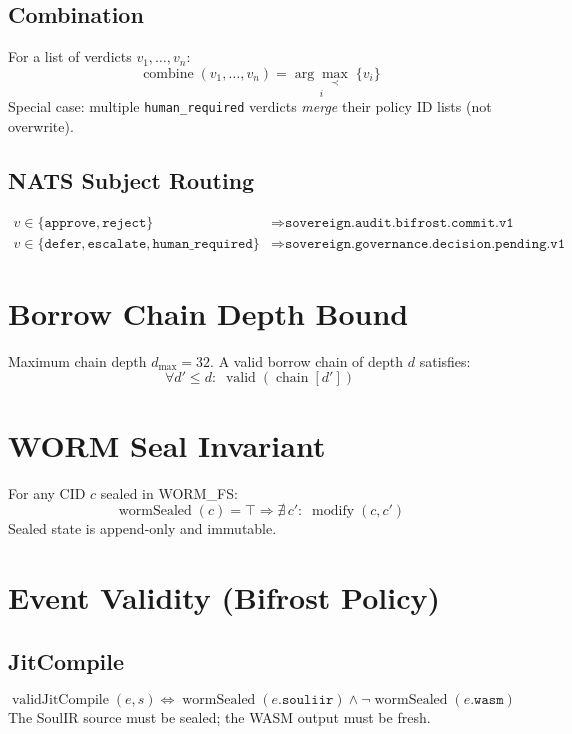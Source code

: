 \documentclass{article}
\begin{document}
\subsection{Combination}
For a list of verdicts $v_1, \ldots, v_n$:
\begin{equation}
  \operatorname{combine}(v_1, \ldots, v_n) = \underset{i}{\arg\max_\prec}\; \{v_i\}
\end{equation}
Special case: multiple \texttt{human\_required} verdicts \emph{merge} their policy ID lists (not overwrite).

\subsection{NATS Subject Routing}
\begin{align}
  v \in \{\texttt{approve}, \texttt{reject}\} &\Rightarrow \texttt{sovereign.audit.bifrost.commit.v1} \\
  v \in \{\texttt{defer}, \texttt{escalate}, \texttt{human\_required}\} &\Rightarrow \texttt{sovereign.governance.decision.pending.v1}
\end{align}

\section{Borrow Chain Depth Bound}
Maximum chain depth $d_{\max} = 32$. A valid borrow chain of depth $d$ satisfies:
\begin{equation}
  \forall d' \leq d:\; \operatorname{valid}(\operatorname{chain}[d'])
\end{equation}

\section{WORM Seal Invariant}
For any CID $c$ sealed in WORM\_FS:
\begin{equation}
  \operatorname{wormSealed}(c) = \top \Rightarrow \nexists\, c':\; \operatorname{modify}(c, c')
\end{equation}
Sealed state is append-only and immutable.

\section{Event Validity (Bifrost Policy)}

\subsection{JitCompile}
\begin{equation}
  \operatorname{validJitCompile}(e, s) \iff \operatorname{wormSealed}(e.\texttt{souliir}) \wedge \neg\operatorname{wormSealed}(e.\texttt{wasm})
\end{equation}
The SoulIR source must be sealed; the WASM output must be fresh.
\end{document}
